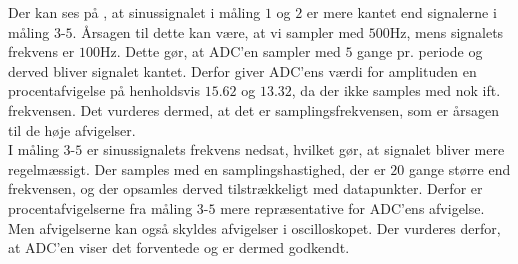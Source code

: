 Der kan ses på , at sinussignalet i måling $1$ og $2$ er mere kantet end signalerne i måling $3$-$5$. Årsagen til dette kan være, at vi sampler med $500$Hz, mens signalets frekvens er $100$Hz. Dette gør, at ADC'en sampler med $5$ gange pr. periode og derved bliver signalet kantet. Derfor giver ADC'ens værdi for amplituden en procentafvigelse på henholdsvis $15.62$ og $13.32$, da der ikke samples med nok ift. frekvensen. Det vurderes dermed, at det er samplingsfrekvensen, som er årsagen til de høje afvigelser.\\
I måling $3$-$5$ er sinussignalets frekvens nedsat, hvilket gør, at signalet bliver mere regelmæssigt. Der samples med en samplingshastighed, der er $20$ gange større end frekvensen, og der opsamles derved tilstrækkeligt med datapunkter. Derfor er procentafvigelserne fra måling $3$-$5$ mere repræsentative for ADC'ens afvigelse. Men afvigelserne kan også skyldes afvigelser i oscilloskopet. Der vurderes derfor, at ADC'en viser det forventede og er dermed godkendt.
